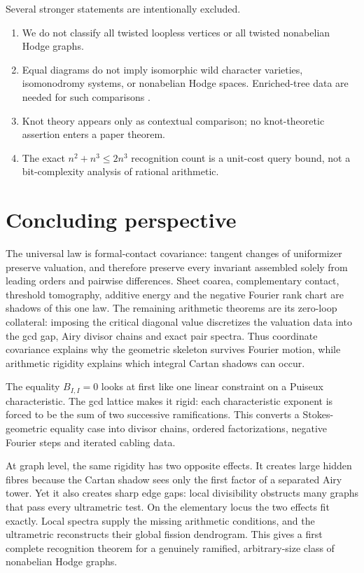 \documentclass[11pt,a4paper]{amsart}
\theoremstyle{plain}
\theoremstyle{definition}
\begin{document}
Several stronger statements are intentionally excluded.
\begin{enumerate}[label=(\roman*)]
\item We do not classify all twisted loopless vertices or all twisted nonabelian Hodge graphs.
\item Equal diagrams do not imply isomorphic wild character varieties, isomonodromy systems, or
nonabelian Hodge spaces.  Enriched-tree data are needed for such comparisons
\cite{Doucot2026Basic}.
\item Knot theory appears only as contextual comparison; no knot-theoretic assertion enters a
paper theorem.
\item The exact $n^2+n^3\le2n^3$ recognition count is a unit-cost query bound, not a bit-complexity
analysis of rational arithmetic.
\end{enumerate}

\section{Concluding perspective}

The universal law is formal-contact covariance: tangent changes of uniformizer preserve valuation,
and therefore preserve every invariant assembled solely from leading orders and pairwise
differences.  Sheet coarea, complementary contact, threshold tomography, additive energy and the
negative Fourier rank chart are shadows of this one law.  The remaining arithmetic theorems are
its zero-loop collateral: imposing the critical diagonal value discretizes the valuation data into
the gcd gap, Airy divisor chains and exact pair spectra.  Thus coordinate covariance explains why
the geometric skeleton survives Fourier motion, while arithmetic rigidity explains which integral
Cartan shadows can occur.

The equality $B_{I,I}=0$ looks at first like one linear constraint on a Puiseux characteristic.
The gcd lattice makes it rigid: each characteristic exponent is forced to be the sum of two
successive ramifications.  This converts a Stokes-geometric equality case into divisor chains,
ordered factorizations, negative Fourier steps and iterated cabling data.

At graph level, the same rigidity has two opposite effects.  It creates large hidden fibres because
the Cartan shadow sees only the first factor of a separated Airy tower.  Yet it also creates sharp
edge gaps: local divisibility obstructs many graphs that pass every ultrametric test.  On the
elementary locus the two effects fit exactly.  Local spectra supply the missing arithmetic
conditions, and the ultrametric reconstructs their global fission dendrogram.  This gives a first
complete recognition theorem for a genuinely ramified, arbitrary-size class of nonabelian Hodge
graphs.
\end{document}
